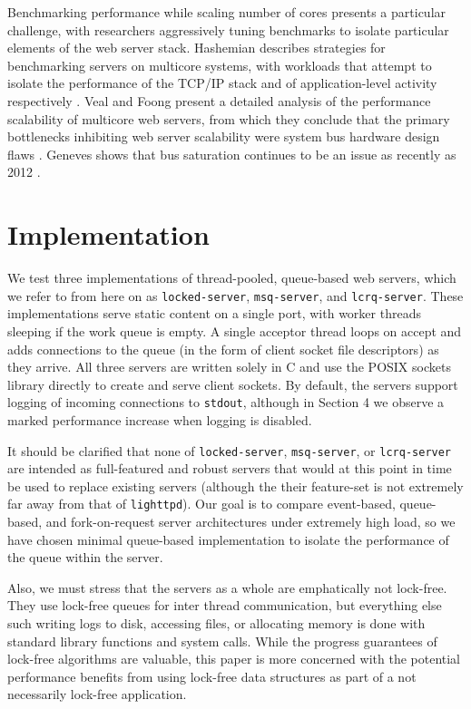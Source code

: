 \documentclass[twoside,10pt]{article}
\begin{document}
\begin{multicols}{2}
Benchmarking performance while scaling number of cores presents a
particular challenge, with researchers aggressively tuning benchmarks
to isolate particular elements of the web server stack. Hashemian
describes strategies for benchmarking servers on multicore systems,
with workloads that attempt to isolate the performance of the TCP/IP
stack and of application-level activity respectively
\cite{hashemian2013improving}. Veal and Foong present a detailed
analysis of the performance scalability of multicore web servers, from
which they conclude that the primary bottlenecks inhibiting web
server scalability were system bus hardware design flaws
\cite{veal2007performance}. Geneves shows that bus saturation
continues to be an issue as recently as 2012
\cite{geneves2012analysis}.

\section{Implementation}

We test three implementations of thread-pooled, queue-based web
servers, which we refer to from here on as \verb+locked-server+,
\verb+msq-server+, and \verb+lcrq-server+. These implementations serve
static content on a single port, with worker threads sleeping if the
work queue is empty. A single acceptor thread loops on accept and adds
connections to the queue (in the form of client socket file
descriptors) as they arrive. All three servers are written solely in C
and use the POSIX sockets library directly to create and serve client
sockets. By default, the servers support logging of incoming
connections to \verb+stdout+, although in Section 4 we observe a
marked performance increase when logging is disabled.

It should be clarified that none of \verb+locked-server+,
\verb+msq-server+, or \verb+lcrq-server+ are intended as full-featured
and robust servers that would at this point in time be used to replace
existing servers (although the their feature-set is not extremely far
away from that of \verb+lighttpd+). Our goal is to compare
event-based, queue-based, and fork-on-request server architectures
under extremely high load, so we have chosen minimal queue-based
implementation to isolate the performance of the queue within the
server.

Also, we must stress that the servers as a whole are emphatically not
lock-free. They use lock-free queues for inter thread communication,
but everything else such writing logs to disk, accessing files, or
allocating memory is done with standard library functions and system
calls. While the progress guarantees of lock-free algorithms are
valuable, this paper is more concerned with the potential performance
benefits from using lock-free data structures as part of a
not necessarily lock-free application.


\end{multicols}
\end{document}
